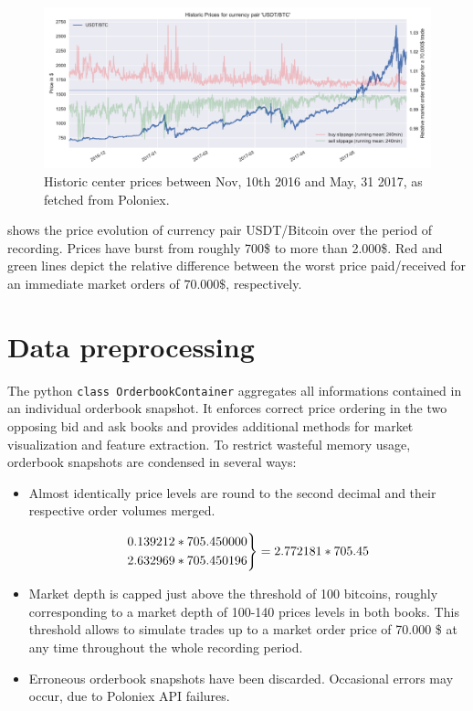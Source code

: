 \begin{figure}[ht]
	\centering
   \includegraphics[width=1.\textwidth]{content/drawings/bitcoin_historicPrices}
	\caption{Historic center prices between Nov, 10th 2016 and May, 31 2017, as fetched from Poloniex.}
	\label{fig:ploniexPriceHistory}
\end{figure}

 shows the price evolution of currency pair USDT/Bitcoin over the period of recording. Prices have burst from roughly 700\$ to more than 2.000\$. Red and green lines depict the relative difference between the worst price paid/received for an immediate market orders of $70.000\$$, respectively.

\section{Data preprocessing}
\label{chap:preprocessing}
The python \lstinline!class OrderbookContainer! aggregates all informations contained in an individual orderbook snapshot. It enforces correct price ordering in the two opposing bid and ask books and provides additional methods for market visualization and feature extraction. To restrict wasteful memory usage, orderbook snapshots are condensed in several ways:

\begin{itemize}
\item Almost identically price levels are round to the second decimal and their respective order volumes merged.

 \[ 
  \begin{rcases}
    0.139212 * 705.450000\\
    2.632969 * 705.450196\\
  \end{rcases} 
  = 2.772181 * 705.45
\]
\item Market depth is capped just above the threshold of 100 bitcoins, roughly corresponding to a market depth of 100-140 prices levels in both books. This threshold allows to simulate trades up to a market order price of 70.000 \$ at any time throughout the whole recording period.

\item Erroneous orderbook snapshots have been discarded. Occasional errors may occur, due to Poloniex API failures.

\end{itemize}

